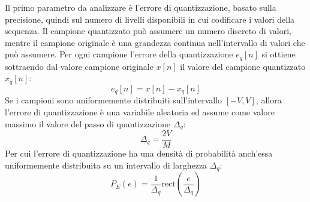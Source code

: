 \documentclass{article}
\newcommand{\rect}{\mathrm{rect}}
\numberwithin{equation}{subsection}
\begin{document}
Il primo parametro da analizzare è l'errore di quantizzazione, basato sulla precisione, quindi sul numero di livelli disponibili in cui 
codificare i valori della sequenza. 
Il campione quantizzato può assumere un numero discreto di valori, mentre il campione originale è una grandezza continua nell'intervallo di valori che può 
assumere. Per ogni campione l'errore della quantizzazione $e_q[n]$ si ottiene sottraendo dal valore campione originale $x[n]$ il valore del campione quantizzato $x_q[n]$: 
\begin{equation}
    e_q[n]=x[n]-x_q[n]
\end{equation}
Se i campioni sono uniformemente distribuiti sull'intervallo $[-V,V]$, allora l'errore di quantizzazione è una variabile aleatoria ed assume come valore massimo 
il valore del passo di quantizzazione $\Delta_q$:
\begin{equation}
    \Delta_q=\displaystyle\frac{2V}{M}
\end{equation}
Per cui l'errore di quantizzazione ha una densità di probabilità anch'essa uniformemente distribuita su un intervallo di larghezza $\Delta_q$:
\begin{equation}
    {P}_E(e)=\displaystyle\frac{1}{\Delta_q}\rect\left(\frac{e}{\Delta_q}\right)
\end{equation}
\end{document}
